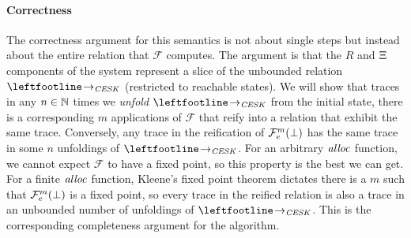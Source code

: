 \paragraph{Correctness} The correctness argument for this semantics is not about single steps but instead about the entire relation that ${\mathcal F}$ computes.
%
The argument is that the $R$ and $\Xi$ components of the system represent a slice of the unbounded relation $\stepto_{\CESK}$ (restricted to reachable states).
%
We will show that traces in any $n \in {\mathbb N}$ times we \emph{unfold} $\stepto_{\CESK}$ from the initial state, there is a corresponding $m$ applications of ${\mathcal F}$ that reify into a relation that exhibit the same trace.
%
Conversely, any trace in the reification of ${\mathcal F}_{e}^m(\bot)$ has the same trace in some $n$ unfoldings of $\stepto_{\CESK}$.
%
For an arbitrary $\mathit{alloc}$ function, we cannot expect ${\mathcal F}$ to have a fixed point, so this property is the best we can get.
%
For a finite $\mathit{alloc}$ function, Kleene's fixed point theorem dictates there is a $m$ such that ${\mathcal F}_{e}^m(\bot)$ is a fixed point, so every trace in the reified relation is also a trace in an unbounded number of unfoldings of $\stepto_{\CESK}$.
%
This is the corresponding completeness argument for the algorithm.

